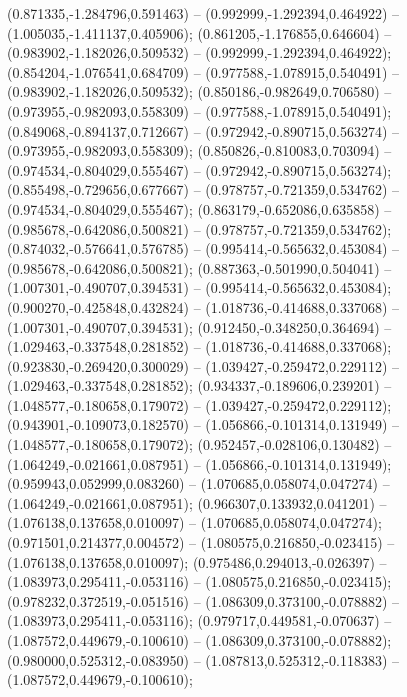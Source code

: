  (0.871335,-1.284796,0.591463) -- (0.992999,-1.292394,0.464922) -- (1.005035,-1.411137,0.405906);
 (0.861205,-1.176855,0.646604) -- (0.983902,-1.182026,0.509532) -- (0.992999,-1.292394,0.464922);
 (0.854204,-1.076541,0.684709) -- (0.977588,-1.078915,0.540491) -- (0.983902,-1.182026,0.509532);
 (0.850186,-0.982649,0.706580) -- (0.973955,-0.982093,0.558309) -- (0.977588,-1.078915,0.540491);
 (0.849068,-0.894137,0.712667) -- (0.972942,-0.890715,0.563274) -- (0.973955,-0.982093,0.558309);
 (0.850826,-0.810083,0.703094) -- (0.974534,-0.804029,0.555467) -- (0.972942,-0.890715,0.563274);
 (0.855498,-0.729656,0.677667) -- (0.978757,-0.721359,0.534762) -- (0.974534,-0.804029,0.555467);
 (0.863179,-0.652086,0.635858) -- (0.985678,-0.642086,0.500821) -- (0.978757,-0.721359,0.534762);
 (0.874032,-0.576641,0.576785) -- (0.995414,-0.565632,0.453084) -- (0.985678,-0.642086,0.500821);
 (0.887363,-0.501990,0.504041) -- (1.007301,-0.490707,0.394531) -- (0.995414,-0.565632,0.453084);
 (0.900270,-0.425848,0.432824) -- (1.018736,-0.414688,0.337068) -- (1.007301,-0.490707,0.394531);
 (0.912450,-0.348250,0.364694) -- (1.029463,-0.337548,0.281852) -- (1.018736,-0.414688,0.337068);
 (0.923830,-0.269420,0.300029) -- (1.039427,-0.259472,0.229112) -- (1.029463,-0.337548,0.281852);
 (0.934337,-0.189606,0.239201) -- (1.048577,-0.180658,0.179072) -- (1.039427,-0.259472,0.229112);
 (0.943901,-0.109073,0.182570) -- (1.056866,-0.101314,0.131949) -- (1.048577,-0.180658,0.179072);
 (0.952457,-0.028106,0.130482) -- (1.064249,-0.021661,0.087951) -- (1.056866,-0.101314,0.131949);
 (0.959943,0.052999,0.083260) -- (1.070685,0.058074,0.047274) -- (1.064249,-0.021661,0.087951);
 (0.966307,0.133932,0.041201) -- (1.076138,0.137658,0.010097) -- (1.070685,0.058074,0.047274);
 (0.971501,0.214377,0.004572) -- (1.080575,0.216850,-0.023415) -- (1.076138,0.137658,0.010097);
 (0.975486,0.294013,-0.026397) -- (1.083973,0.295411,-0.053116) -- (1.080575,0.216850,-0.023415);
 (0.978232,0.372519,-0.051516) -- (1.086309,0.373100,-0.078882) -- (1.083973,0.295411,-0.053116);
 (0.979717,0.449581,-0.070637) -- (1.087572,0.449679,-0.100610) -- (1.086309,0.373100,-0.078882);
 (0.980000,0.525312,-0.083950) -- (1.087813,0.525312,-0.118383) -- (1.087572,0.449679,-0.100610);
